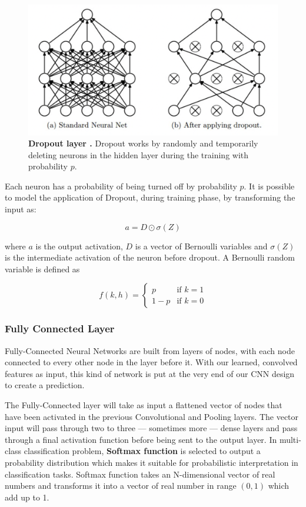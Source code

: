 \documentclass[conference]{IEEEtran}
\begin{document}
\begin{figure}[h!]
\centering
\includegraphics[width=1\linewidth]{images/dropout.jpg}
\caption{\textbf{Dropout layer \cite{b4}.} Dropout works by randomly and temporarily deleting neurons in the hidden layer during the training with probability \( p \).}
\label{fig:dropout}
\end{figure}

Each neuron has a probability of being turned off by probability \( p \). It is possible to model the application of Dropout, during training phase, by transforming the input as:

\[ a = D\odot\sigma(Z)  \]

where \( a \) is the output activation, \( D \) is a vector of Bernoulli variables and \( \sigma(Z) \) is the intermediate activation of the neuron before dropout. A Bernoulli random variable is defined as

\[ f(k,h) = 
\begin{cases}
      p & \text{if $k = 1$}\\
      1 - p & \text{if $k = 0$}
    \end{cases}       \]

\subsubsection{Fully Connected Layer}

Fully-Connected Neural Networks are built from layers of nodes, with each node connected to every other node in the layer before it. With our learned, convolved features as input, this kind of network is put at the very end of our CNN design to create a prediction.

The Fully-Connected layer will take as input a flattened vector of nodes that have been activated in the previous Convolutional and Pooling layers. The vector input will pass through two to three — sometimes more — dense layers and pass through a final activation function before being sent to the output layer. In multi-class classification problem, \textbf{Softmax function} is selected to output a probability distribution which makes it suitable for probabilistic interpretation in classification tasks. Softmax function takes an N-dimensional vector of real numbers and transforms it into a vector of real number in range \( (0,1) \) which add up to 1.
\end{document}
